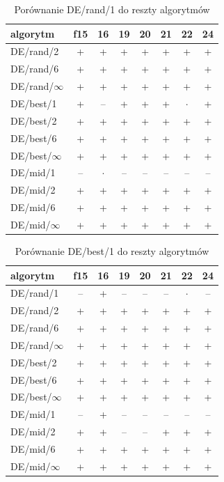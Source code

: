 \documentclass[a4paper,onecolumn,oneside,11pt,wide,floatssmall]{mwrep}
\theoremstyle{definition}
\theoremstyle{plain}%
\theoremstyle{remark}
\begin{document}
\begin{table}[H]
\centering
\begin{tabular}{ l | c | c | c | c | c | c | c }
algorytm         &f15& 16& 19& 20& 21& 22& 24 \\ \hline
DE/rand/2	 & + & + & + & + & + & + & + \\
DE/rand/6	 & + & + & + & + & + & + & + \\
DE/rand/$\infty$	 & + & + & + & + & + & + & + \\
DE/best/1	 & + & -- & + & + & + & $\cdot$ & + \\
DE/best/2	 & + & + & + & + & + & + & + \\
DE/best/6	 & + & + & + & + & + & + & + \\
DE/best/$\infty$	 & + & + & + & + & + & + & + \\
DE/mid/1	 & -- & $\cdot$ & -- & -- & -- & -- & -- \\
DE/mid/2	 & + & + & + & + & + & + & + \\
DE/mid/6	 & + & + & + & + & + & + & + \\
DE/mid/$\infty$	 & + & + & + & + & + & + & + \\
\end{tabular}
\caption{Porównanie DE/rand/1 do reszty algorytmów}
\end{table}

\begin{table}[H]
\centering
\begin{tabular}{ l | c | c | c | c | c | c | c }
algorytm         &f15& 16& 19& 20& 21& 22& 24 \\ \hline
DE/rand/1	 & -- & + & -- & -- & -- & $\cdot$ & -- \\
DE/rand/2	 & + & + & + & + & + & + & + \\
DE/rand/6	 & + & + & + & + & + & + & + \\
DE/rand/$\infty$	 & + & + & + & + & + & + & + \\
DE/best/2	 & + & + & + & + & + & + & + \\
DE/best/6	 & + & + & + & + & + & + & + \\
DE/best/$\infty$	 & + & + & + & + & + & + & + \\
DE/mid/1	 & -- & + & -- & -- & -- & -- & -- \\
DE/mid/2	 & + & + & -- & -- & + & + & + \\
DE/mid/6	 & + & + & + & + & + & + & + \\
DE/mid/$\infty$	 & + & + & + & + & + & + & + \\

\end{tabular}
\caption{Porównanie DE/best/1 do reszty algorytmów}
\end{table}
\end{document}
